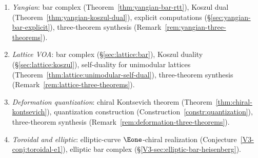 \begin{remark}
\begin{enumerate}
	 genus-$1$ computation (\S\ref{sec:w3-genus-one-computation}),
 general $\kappa$ formula (Theorem~\ref{thm:wn-obstruction}),
 three-theorem synthesis
 (Remark~\ref{rem:w-algebra-three-theorems}).
\item \emph{Yangian}:
 bar complex (Theorem~\ref{thm:yangian-bar-rtt}),
 Koszul dual (Theorem~\ref{thm:yangian-koszul-dual}),
 explicit computations (\S\ref{sec:yangian-bar-explicit}),
 three-theorem synthesis
 (Remark~\ref{rem:yangian-three-theorems}).
\item \emph{Lattice VOA}:
 bar complex (\S\ref{sec:lattice:bar}),
 Koszul duality (\S\ref{sec:lattice:koszul}),
 self-duality for unimodular lattices
 (Theorem~\ref{thm:lattice:unimodular-self-dual}),
 three-theorem synthesis
 (Remark~\ref{rem:lattice-three-theorems}).
\item \emph{Deformation quantization}:
 chiral Kontsevich theorem
 (Theorem~\ref{thm:chiral-kontsevich}),
 quantization construction
 (Construction~\ref{constr:quantization}),
 three-theorem synthesis
 (Remark~\ref{rem:deformation-three-theorems}).
\item \emph{Toroidal and elliptic}:
 elliptic-curve $\Eone$-chiral realization
 (Conjecture~\ref{V3-conj:toroidal-e1}),
 elliptic bar complex
 (\S\ref{V3-sec:elliptic-bar-heisenberg}).
\end{enumerate}
\end{remark}

